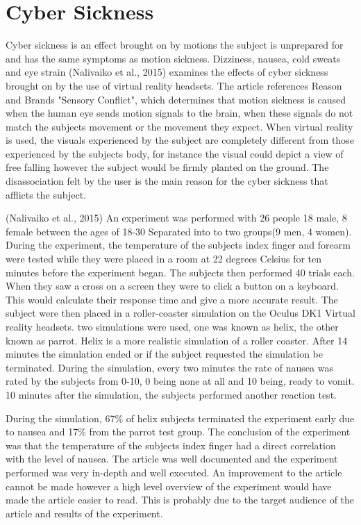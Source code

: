 \documentclass[10pt,journal,compsoc]{IEEEtran}
\begin{document}
\section{Cyber Sickness}
Cyber sickness is an effect brought on by motions the subject is unprepared for and has the same symptoms as motion sickness. Dizziness, nausea, cold sweats and eye strain (Nalivaiko et al., 2015) examines the effects of cyber sickness brought on by the use of virtual reality headsets. The article references Reason and Brands "Sensory Conflict", which determines that motion sickness is caused when the human eye sends motion signals to the brain, when these signals do not match the subjects movement or the movement they expect. When virtual reality is used, the visuals experienced by the subject are completely different from those experienced by the subjects body, for instance the visual could depict a view of free falling however the subject would be firmly planted on the ground. The disassociation felt by the user is the main reason for the cyber sickness that afflicts the subject. \newline

(Nalivaiko et al., 2015) An experiment was performed with 26 people 18 male, 8 female between the ages of 18-30 Separated into to two groups(9 men, 4 women). During the experiment, the temperature of the subjects index finger and forearm were tested while they were placed in a room at 22 degrees Celsius for ten minutes before the experiment began. The subjects then performed 40 trials each. When they saw a cross on a screen they were to click a button on a keyboard. This would calculate their response time and give a more accurate result. The subject were then placed in a roller-coaster simulation on the Oculus DK1 Virtual reality headsets. two simulations were used, one was known as helix, the other known as parrot. Helix is a more realistic simulation of a roller coaster. After 14 minutes the simulation ended or if the subject requested the simulation be terminated. During the simulation, every two minutes the rate of nausea was rated by the subjects from 0-10, 0 being none at all and 10 being, ready to vomit. 10 minutes after the simulation, the subjects performed another reaction test.\newline

During the simulation, 67\% of helix subjects terminated the experiment early due to nausea and 17\% from the parrot test group. The conclusion of the experiment was that the temperature of the subjects index finger had a direct correlation with the level of nausea. The article was well documented and the experiment performed was very in-depth and well executed. An improvement to the article cannot be made however a high level overview of the experiment would have made the article easier to read. This is probably due to the target audience of the article and results of the experiment.
\end{document}
